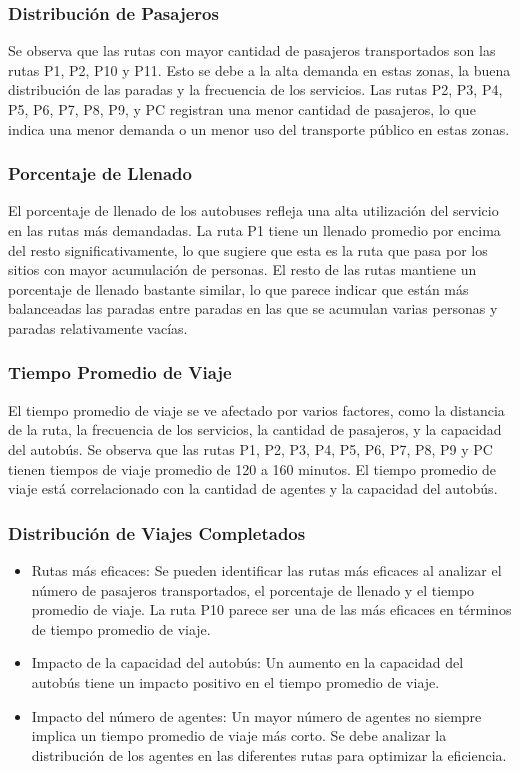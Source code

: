\documentclass[a4paper,12pt]{article}
\begin{document}
\subsubsection{Distribución de Pasajeros}

Se observa que las rutas con mayor cantidad de pasajeros transportados son las rutas P1, P2, P10 y P11. Esto se debe a la alta demanda en estas zonas, la buena distribución de las paradas y la frecuencia de los servicios. Las rutas P2, P3, P4, P5, P6, P7, P8, P9, y PC registran una menor cantidad de pasajeros, lo que indica una menor demanda o un menor uso del transporte público en estas zonas.

\subsubsection{Porcentaje de Llenado}

El porcentaje de llenado de los autobuses refleja una alta utilización del servicio en las rutas más demandadas. La ruta P1 tiene un llenado promedio por encima del resto significativamente, lo que sugiere que esta es la ruta que pasa por los sitios con mayor acumulación de personas. El resto de las rutas mantiene un porcentaje de llenado bastante similar, lo que parece indicar que están más balanceadas las paradas entre paradas en las que se acumulan varias personas y paradas relativamente vacías.

\subsubsection{Tiempo Promedio de Viaje}

El tiempo promedio de viaje se ve afectado por varios factores, como la distancia de la ruta, la frecuencia de los servicios, la cantidad de pasajeros, y la capacidad del autobús. Se observa que las rutas P1, P2, P3, P4, P5, P6, P7, P8, P9 y PC tienen tiempos de viaje promedio de 120 a 160 minutos. El tiempo promedio de viaje está correlacionado con la cantidad de agentes y la capacidad del autobús.

\subsubsection{Distribución de Viajes Completados}

\begin{itemize}
\item Rutas más eficaces: Se pueden identificar las rutas más eficaces al analizar el número de pasajeros transportados, el porcentaje de llenado y el tiempo promedio de viaje. La ruta P10 parece ser una de las más eficaces en términos de tiempo promedio de viaje.
\item Impacto de la capacidad del autobús: Un aumento en la capacidad del autobús tiene un impacto positivo en el tiempo promedio de viaje.
\item Impacto del número de agentes: Un mayor número de agentes no siempre implica un tiempo promedio de viaje más corto. Se debe analizar la distribución de los agentes en las diferentes rutas para optimizar la eficiencia.
\end{itemize}
\end{document}
